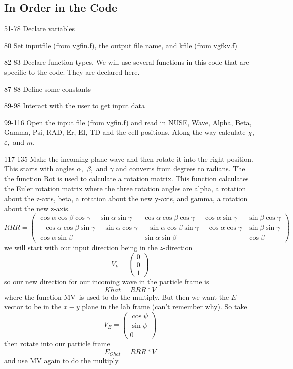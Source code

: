 \documentclass{article}
\begin{document}
\bigskip

\bigskip

\subsection{In Order in the Code}

51-78 Declare variables

80 Set inputfile (from vgfin.f), the output file name, and kfile (from
vgfkv.f)

82-83 Declare function types. We will use several functions in this code
that are specific to the code. They are declared here.

87-88 Define some constants

89-98 Interact with the user to get input data

99-116 Open the input file (from vgfin.f) and read in NUSE, Wave, Alpha,
Beta, Gamma, Psi, RAD, Er, EI, TD and the cell positions. Along the way
calculate $\chi $, $\varepsilon ,$ and $m.$

117-135 Make the incoming plane wave and then rotate it into the right
position. This starts with angles $\alpha ,$ $\beta ,$ and $\gamma $ and
converts from degrees to radians. The the function Rot is used to calculate
a rotation matrix. This function calculates the Euler rotation matrix where
the three rotation angles are alpha, a rotation about the z-axis, beta, a
rotation about the new y-axis, and gamma, a rotation about the new z-axis. 
\[
RRR=\left( 
\begin{array}{ccc}
\cos \alpha \cos \beta \cos \gamma -\sin \alpha \sin \gamma  & \cos \alpha
\cos \beta \cos \gamma -\cos \alpha \sin \gamma  & \sin \beta \cos \gamma 
\\ 
-\cos \alpha \cos \beta \sin \gamma -\sin \alpha \cos \gamma  & -\sin \alpha
\cos \beta \sin \gamma +\cos \alpha \cos \gamma  & \sin \beta \sin \gamma 
\\ 
\cos \alpha \sin \beta  & \sin \alpha \sin \beta  & \cos \beta 
\end{array}%
\right) 
\]%
we will start with our input direction being in the $z$-direction%
\[
V_{k}=\left( 
\begin{array}{c}
0 \\ 
0 \\ 
1%
\end{array}%
\right) 
\]%
so our new direction for our incoming wave in the particle frame is 
\[
Khat=RRR\ast V
\]%
where the function MV\ is used to do the multiply. But then we want the $E$%
-vector to be in the $x-y$ plane in the lab frame (can't remember why). So
take 
\[
V_{E}=\left( 
\begin{array}{c}
\cos \psi  \\ 
\sin \psi  \\ 
0%
\end{array}%
\right) 
\]%
then rotate into our particle frame%
\[
E_{Ohat}=RRR\ast V
\]%
and use MV again to do the multiply.
\end{document}
